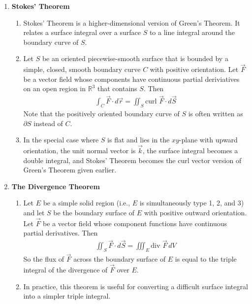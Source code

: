 \documentclass[10pt]{article}
\begin{document}
\begin{multicols*}{2}
\begin{enumerate}
    \item \textbf{Stokes' Theorem}
    \begin{enumerate}
        \item Stokes' Theorem is a higher-dimensional version of Green's Theorem. It relates a surface integral over a surface $S$ to a line integral around the boundary curve of $S$.
        \item Let $S$ be an oriented piecewise-smooth surface that is bounded by a simple, closed, smooth boundary curve $C$ with positive orientation. Let $\vec{F}$ be a vector field whose components have continuous partial deriviatives on an open region in $\mathbb{R}^3$ that contains $S$. Then
        \begin{align*}
            \int_C \vec{F} \cdot d\vec{r} = \iint_S \text{curl } \vec{F} \cdot d\vec{S}
        \end{align*}
        Note that the positively oriented boundary curve of $S$ is often written as $\partial S$ instead of $C$.
        
        \item In the special case where $S$ is flat and lies in the $xy$-plane with upward  orientation, the unit normal vector is $\vec{k}$, the surface integral becomes a double integral, and Stokes' Theorem becomes the curl vector version of Green's Theorem given earlier.
    \end{enumerate}
    
    \item \textbf{The Divergence Theorem}
    \begin{enumerate}
        \item Let $E$ be a simple solid region (i.e., $E$ is simultaneously type 1, 2, and 3) and let $S$ be the boundary surface of $E$ with positive outward orientation. Let $\vec{F}$ be a vector field whose component functions have continuous partial derivatives. Then
        \begin{align*}
            \iint_S \vec{F} \cdot d\vec{S} = \iiint_E \text{div } \vec{F} \,dV
        \end{align*}
        So the flux of $\vec{F}$ across the boundary surface of $E$ is equal to the triple integral of the divergence of $\vec{F}$ over $E$.
        \item In practice, this theorem is useful for converting a difficult surface integral into a simpler triple integral.
    \end{enumerate}
\end{enumerate}
\end{multicols*}
\end{document}
